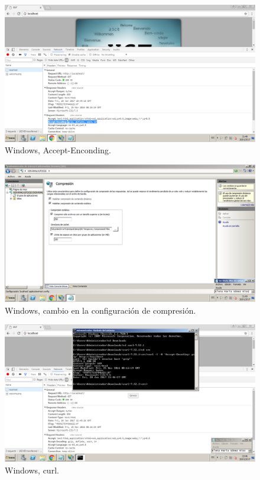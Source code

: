 \begin{figure}[H] 
	\centering
	\includegraphics[width=14.7cm]{./img/ejercicio5_3.png} 	
	\caption{Windows, Accept-Enconding.} \label{fig:ejercicio5_3}
\end{figure}

\begin{figure}[H] 
	\centering
	\includegraphics[width=14.7cm]{./img/ejercicio5_4.png} 	
	\caption{Windows, cambio en la configuración de compresión.} \label{fig:ejercicio5_4}
\end{figure}

\begin{figure}[H] 
	\centering
	\includegraphics[width=14.7cm]{./img/ejercicio5_5.png} 	
	\caption{Windows, curl.} \label{fig:ejercicio5_5}
\end{figure}


